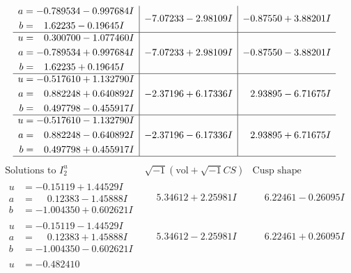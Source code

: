 \documentclass[1p]{elsarticle_modified}
\theoremstyle{definition}
\newcommand{\I}{\sqrt{-1}}
\begin{document}
$$\begin{array}{c|c|c}
\begin{aligned}
a &= -0.789534 - 0.997684 I \\
b &= \phantom{-}1.62235 - 0.19645 I\end{aligned}
 & -7.07233 - 2.98109 I & -0.87550 + 3.88201 I \\ \hline\begin{aligned}
u &= \phantom{-}0.300700 - 1.077460 I \\
a &= -0.789534 + 0.997684 I \\
b &= \phantom{-}1.62235 + 0.19645 I\end{aligned}
 & -7.07233 + 2.98109 I & -0.87550 - 3.88201 I \\ \hline\begin{aligned}
u &= -0.517610 + 1.132790 I \\
a &= \phantom{-}0.882248 + 0.640892 I \\
b &= \phantom{-}0.497798 - 0.455917 I\end{aligned}
 & -2.37196 + 6.17336 I & \phantom{-}2.93895 - 6.71675 I \\ \hline\begin{aligned}
u &= -0.517610 - 1.132790 I \\
a &= \phantom{-}0.882248 - 0.640892 I \\
b &= \phantom{-}0.497798 + 0.455917 I\end{aligned}
 & -2.37196 - 6.17336 I & \phantom{-}2.93895 + 6.71675 I\\
 \hline 
 \end{array}$$\newpage$$\begin{array}{c|c|c}  
\text{Solutions to }I^u_{2}& \I (\text{vol} + \sqrt{-1}CS) & \text{Cusp shape}\\
 \hline 
\begin{aligned}
u &= -0.15119 + 1.44529 I \\
a &= \phantom{-}0.12383 - 1.45888 I \\
b &= -1.004350 + 0.602621 I\end{aligned}
 & \phantom{-}5.34612 + 2.25981 I & \phantom{-}6.22461 - 0.26095 I \\ \hline\begin{aligned}
u &= -0.15119 - 1.44529 I \\
a &= \phantom{-}0.12383 + 1.45888 I \\
b &= -1.004350 - 0.602621 I\end{aligned}
 & \phantom{-}5.34612 - 2.25981 I & \phantom{-}6.22461 + 0.26095 I \\ \hline\begin{aligned}
u &= -0.482410\phantom{ +0.000000I} \\

\end{aligned}
\end{array}$$
\end{document}
